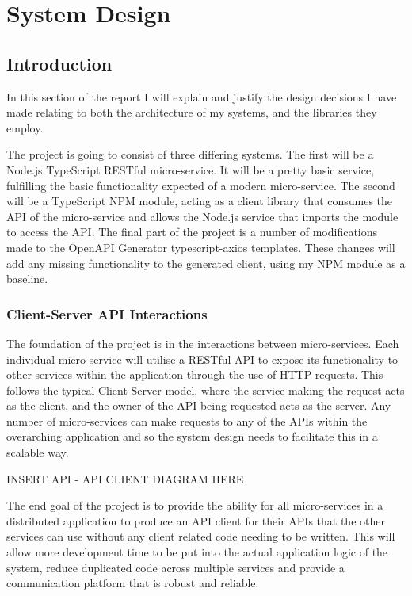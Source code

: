 \chapter{System Design}
\section{Introduction}
In this section of the report I will explain and justify the design decisions I have made relating to both the architecture of my systems, and the libraries they employ.

The project is going to consist of three differing systems. The first will be a Node.js TypeScript RESTful micro-service. It will be a pretty basic service, fulfilling the basic functionality expected of a modern micro-service. The second will be a TypeScript NPM module, acting as a client library that consumes the API of the micro-service and allows the Node.js service that imports the module to access the API. The final part of the project is a number of modifications made to the OpenAPI Generator typescript-axios templates. These changes will add any missing functionality to the generated client, using my NPM module as a baseline.

\subsection{Client-Server API Interactions}

The foundation of the project is in the interactions between micro-services. Each individual micro-service will utilise a RESTful API to expose its functionality to other services within the application through the use of HTTP requests. This follows the typical Client-Server model, where the service making the request acts as the client, and the owner of the API being requested acts as the server. Any number of micro-services can make requests to any of the APIs within the overarching application and so the system design needs to facilitate this in a scalable way.

INSERT API - API CLIENT DIAGRAM HERE

The end goal of the project is to provide the ability for all micro-services in a distributed application to produce an API client for their APIs that the other services can use without any client related code needing to be written. This will allow more development time to be put into the actual application logic of the system, reduce duplicated code across multiple services and provide a communication platform that is robust and reliable. 


